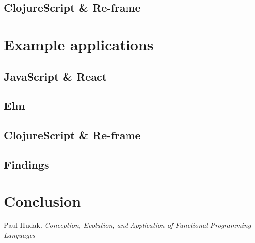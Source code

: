 \documentclass[12pt, titlepage]{article}
\begin{document}
\subsection{ClojureScript \& Re-frame}

\section{Example applications}
\subsection{JavaScript \& React}

\subsection{Elm}

\subsection{ClojureScript \& Re-frame}

\subsection{Findings}

\section{Conclusion}

\renewcommand{\refname}{References}

\begin{thebibliography}{9}

Paul Hudak.
\textit{Conception, Evolution, and Application of Functional Programming Languages}

\end{thebibliography}
\end{document}

